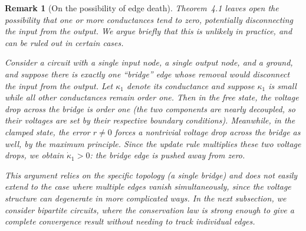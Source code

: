 \documentclass[final, 11pt, nonatbib]{elsarticle}
\theoremstyle{definition}
\theoremstyle{plain}
\newtheorem{remark}[definition]{Remark}
\newcommand{\AGK}{\color{blue}}
\numberwithin{equation}{section}
\begin{document}
\begin{remark}[On the possibility of edge death]\label{rmk:edge_death}
Theorem~4.1 %
leaves open the possibility that one or more conductances tend to zero,
potentially disconnecting the input from the output.  We argue briefly that
this is unlikely in practice, and can be ruled out in certain cases.

Consider a circuit with a single input node, a single output node, and a
ground, and suppose there is exactly one ``bridge'' edge whose removal would
disconnect the input from the output.  Let $\kappa_1$ denote its conductance
and suppose $\kappa_1$ is small while all other conductances remain order one.
Then in the free state, the voltage drop across the bridge is order one
(the two components are nearly decoupled, so their voltages are set by their
respective boundary conditions).  Meanwhile, in the clamped state, the
error $r \neq 0$ forces a nontrivial voltage drop across the bridge as well,
by the maximum principle.  Since the update rule multiplies these two voltage
drops, we obtain $\dot{\kappa}_1 > 0$: the bridge edge is pushed away from zero.

This argument relies on the specific topology (a single bridge) and does not
easily extend to the case where multiple edges vanish simultaneously, since
the voltage structure can degenerate in more complicated ways.
In the next subsection, we consider bipartite circuits, where the
conservation law is strong enough to give a complete convergence result
without needing to track individual edges.
\end{remark}


\end{document}
